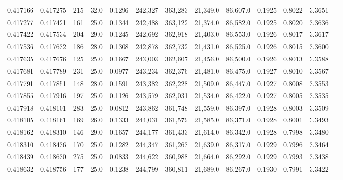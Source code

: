 \begin{tabular}{rrrrrrrrrrrrr}
0.417166 & 0.417275 &   215 & 32.0 &                                     0.1296 & 242,327 & 363,283 &  21,349.0 &  86,607.0 & 0.1925 & 0.8022 & 3.3651 \\
0.417277 & 0.417421 &   161 & 25.0 &                                     0.1344 & 242,488 & 363,122 &  21,374.0 &  86,582.0 & 0.1925 & 0.8020 & 3.3636 \\
0.417422 & 0.417534 &   204 & 29.0 &                                     0.1245 & 242,692 & 362,918 &  21,403.0 &  86,553.0 & 0.1926 & 0.8017 & 3.3617 \\
0.417536 & 0.417632 &   186 & 28.0 &                                     0.1308 & 242,878 & 362,732 &  21,431.0 &  86,525.0 & 0.1926 & 0.8015 & 3.3600 \\
0.417635 & 0.417676 &   125 & 25.0 &                                     0.1667 & 243,003 & 362,607 &  21,456.0 &  86,500.0 & 0.1926 & 0.8013 & 3.3588 \\
0.417681 & 0.417789 &   231 & 25.0 &                                     0.0977 & 243,234 & 362,376 &  21,481.0 &  86,475.0 & 0.1927 & 0.8010 & 3.3567 \\
0.417791 & 0.417851 &   148 & 28.0 &                                     0.1591 & 243,382 & 362,228 &  21,509.0 &  86,447.0 & 0.1927 & 0.8008 & 3.3553 \\
0.417855 & 0.417916 &   197 & 25.0 &                                     0.1126 & 243,579 & 362,031 &  21,534.0 &  86,422.0 & 0.1927 & 0.8005 & 3.3535 \\
0.417918 & 0.418101 &   283 & 25.0 &                                     0.0812 & 243,862 & 361,748 &  21,559.0 &  86,397.0 & 0.1928 & 0.8003 & 3.3509 \\
0.418105 & 0.418161 &   169 & 26.0 &                                     0.1333 & 244,031 & 361,579 &  21,585.0 &  86,371.0 & 0.1928 & 0.8001 & 3.3493 \\
0.418162 & 0.418310 &   146 & 29.0 &                                     0.1657 & 244,177 & 361,433 &  21,614.0 &  86,342.0 & 0.1928 & 0.7998 & 3.3480 \\
0.418310 & 0.418436 &   170 & 25.0 &                                     0.1282 & 244,347 & 361,263 &  21,639.0 &  86,317.0 & 0.1929 & 0.7996 & 3.3464 \\
0.418439 & 0.418630 &   275 & 25.0 &                                     0.0833 & 244,622 & 360,988 &  21,664.0 &  86,292.0 & 0.1929 & 0.7993 & 3.3438 \\
0.418632 & 0.418756 &   177 & 25.0 &                                     0.1238 & 244,799 & 360,811 &  21,689.0 &  86,267.0 & 0.1930 & 0.7991 & 3.3422 \\

\end{tabular}

